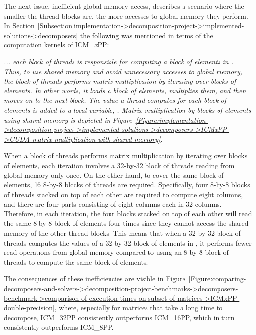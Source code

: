 The next issue, inefficient global memory access, describes a scenario where the smaller the thread blocks are, the more accesses to global memory they perform.
In Section~\ref{Subsection:implementation->decomposition-project->implemented-solutions->decomposers} the following was mentioned in terms of the computation kernels of ICM\_\textit{x}PP:

\begin{quoting}
	\textit{... each block of threads is responsible for computing a block of elements in .
Thus, to use shared memory and avoid unnecessary accesses to global memory, the block of threads performs matrix multiplication by iterating over blocks of elements.
In other words, it loads a block of elements, multiplies them, and then moves on to the next block.
The value a thread computes for each block of elements is added to a local variable, .
Matrix multiplication by blocks of elements using shared memory is depicted in Figure~\ref{Figure:implementation->decomposition-project->implemented-solutions->decomposers->ICMxPP->CUDA-matrix-multiplication-with-shared-memory}.}
\end{quoting}

When a block of threads performs matrix multiplication by iterating over blocks of elements, each iteration involves a 32-by-32 block of threads reading from global memory only once.
On the other hand, to cover the same block of elements, 16 8-by-8 blocks of threads are required.
Specifically, four 8-by-8 blocks of threads stacked on top of each other are required to compute eight columns, and there are four parts consisting of eight columns each in 32 columns.
Therefore, in each iteration, the four blocks stacked on top of each other will read the same 8-by-8 block of elements four times since they cannot access the shared memory of the other thread blocks.
This means that when a 32-by-32 block of threads computes the values of a 32-by-32 block of elements in , it performs fewer read operations from global memory compared to using an 8-by-8 block of threads to compute the same block of elements.

The consequences of these inefficiencies are visible in Figure~\ref{Figure:comparing-decomposers-and-solvers->decomposition-project-benchmarks->decomposers-benchmark->comparison-of-execution-times-on-subset-of-matrices->ICMxPP-double-precision}, where, especially for matrices that take a long time to decompose, ICM\_32PP consistently outperforms ICM\_16PP, which in turn consistently outperforms ICM\_8PP.\label{Text:comparing-decomposers-and-solvers->decomposition-project-benchmarks->decomposers-benchmark->comparison-of-execution-times-on-subset-of-matrices->ICMxPP->performance-of-variants}

